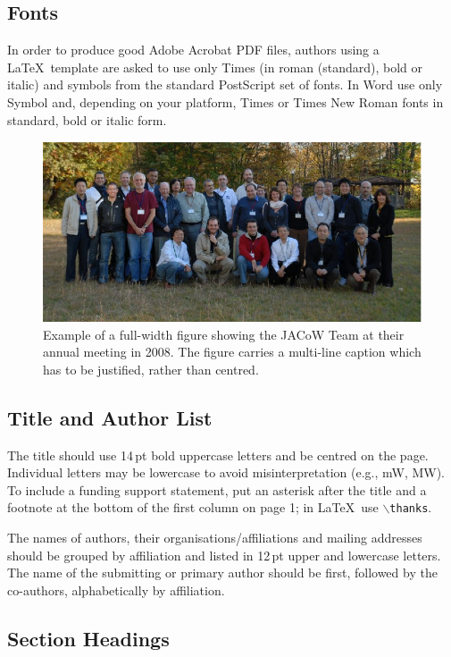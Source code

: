 \documentclass{JAC2003}
\begin{document}
\subsection{Fonts}

In order to produce good Adobe Acrobat PDF files, 
authors using a \LaTeX\ template are asked to use only Times (in roman (standard), bold or
italic) and symbols from  the standard PostScript set of
fonts. In Word use only Symbol and, depending on your platform, Times or Times New Roman fonts in standard, bold or italic form. 

\begin{figure}[tb]
    \centering
    \includegraphics*[width=168mm]{JACpic2v2.eps}
    \caption{Example of a full-width figure showing the JACoW Team at their annual meeting in 2008. 
    The figure carries a multi-line caption which has to be justified, rather than centred.}
    \label{l2ea4-f2}
\end{figure}

\subsection{Title and Author List}

The title should use 14\,pt bold uppercase letters and be centred on the page.
Individual letters may be lowercase to avoid misinterpretation (e.g., mW, MW).
To include a funding support statement, put an asterisk after the title and a
footnote at the bottom of the first column on page 1; in \LaTeX\ use
$\backslash$\texttt{thanks}.
  
The names of authors, their organisations/affiliations and mailing addresses 
should be grouped by affiliation and listed in 12\,pt upper and lowercase letters.
The name of the submitting or primary author should be first, followed by 
the co-authors, alphabetically by affiliation.


\subsection{Section Headings}
\end{document}

